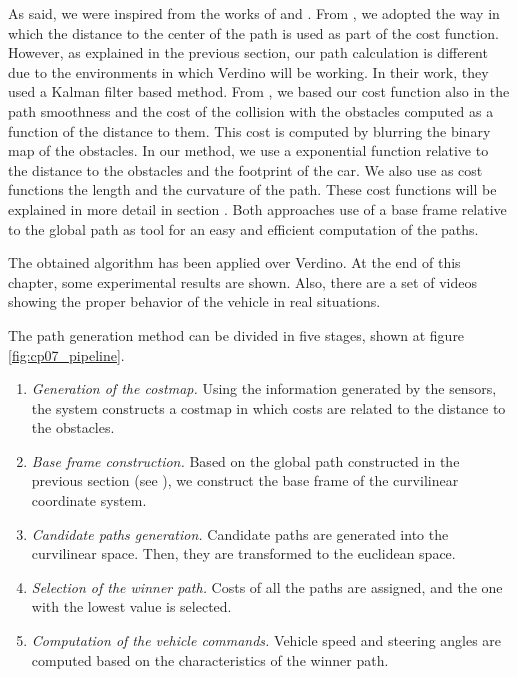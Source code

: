 As said, we were inspired from the works of \cite{chu2012local} and \cite{thrun2006stanley}. From \cite{thrun2006stanley}, we adopted the way in which the distance to the center of the path is used as part of the cost function. However, as explained in the previous section, our path calculation is different due to the environments in which Verdino will be working. In their work, they used a Kalman filter based method.
From \cite{chu2012local}, we based our cost function also in the path smoothness and the cost of the collision with the obstacles computed as a function of the distance to them. This cost is computed by blurring the binary map of the obstacles. In our method, we use a exponential function relative to the distance to the obstacles and the footprint of the car.
We also use as cost functions the length and the curvature of the path. These cost functions will be explained in more detail in section . Both approaches use of a base frame relative to the global path as tool for an easy and efficient computation of the paths.

The obtained algorithm has been applied over Verdino. At the end of this chapter, some experimental results are shown. Also, there are a set of videos showing the proper behavior of the vehicle in real situations.

The path generation method can be divided in five stages, shown at figure \ref{fig:cp07_pipeline}.
\begin{enumerate}
 \item \emph{Generation of the costmap.} Using the information generated by the sensors, the system constructs a costmap in which costs are related to the distance to the obstacles.
 \item \emph{Base frame construction.} Based on the global path constructed in the previous section (see ), we construct the base frame of the curvilinear coordinate system.
 \item \emph{Candidate paths generation.} Candidate paths are generated into the curvilinear space. Then, they are transformed to the euclidean space.
 \item \emph{Selection of the winner path.} Costs of all the paths are assigned, and the one with the lowest value is selected.
 \item \emph{Computation of the vehicle commands.} Vehicle speed and steering angles are computed based on the characteristics of the winner path.
\end{enumerate}

